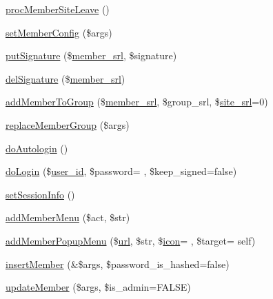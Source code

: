 \begin{DoxyCompactItemize}
\item 
\hyperlink{classmemberController_a46240bb8dbfcff52844ce8387076ca61}{proc\+Member\+Site\+Leave} ()
\item 
\hyperlink{classmemberController_a842fafd2abf22d779591486124003d92}{set\+Member\+Config} (\$args)
\item 
\hyperlink{classmemberController_a084c3af4daea1a860f95e06f2bc5fc28}{put\+Signature} (\$\hyperlink{ko_8install_8php_aa61f9e08f0fe505094d26f8143f30bbd}{member\+\_\+srl}, \$signature)
\item 
\hyperlink{classmemberController_a0fa2ec662eb7a40333ca2049a103385e}{del\+Signature} (\$\hyperlink{ko_8install_8php_aa61f9e08f0fe505094d26f8143f30bbd}{member\+\_\+srl})
\item 
\hyperlink{classmemberController_aca7533f0e95df7227073436c24827c7b}{add\+Member\+To\+Group} (\$\hyperlink{ko_8install_8php_aa61f9e08f0fe505094d26f8143f30bbd}{member\+\_\+srl}, \$group\+\_\+srl, \$\hyperlink{ko_8install_8php_a8b1406b4ad1048041558dce6bfe89004}{site\+\_\+srl}=0)
\item 
\hyperlink{classmemberController_acc92443cdd02e55cec12099722482737}{replace\+Member\+Group} (\$args)
\item 
\hyperlink{classmemberController_aeb2590d01346c9a25c2b22f99429f6a3}{do\+Autologin} ()
\item 
\hyperlink{classmemberController_a92930ff9a5763ef9d6d292c7154269e4}{do\+Login} (\$\hyperlink{ko_8install_8php_a74f1a394389d774e5b4cd5d1d15413f7}{user\+\_\+id}, \$password= \textquotesingle{}\textquotesingle{}, \$keep\+\_\+signed=false)
\item 
\hyperlink{classmemberController_ae4175b4a60e0b3000ed12e36508720ad}{set\+Session\+Info} ()
\item 
\hyperlink{classmemberController_aaa52725f8ba9ba16cfe4b350a51d7420}{add\+Member\+Menu} (\$act, \$str)
\item 
\hyperlink{classmemberController_a91303fbd27713d1990f88b8dd3c09b2b}{add\+Member\+Popup\+Menu} (\$\hyperlink{swfupload_8js_a440a52a9004fdab0700100a6ddb49f67}{url}, \$str, \$\hyperlink{config_8min_8js_a939508fb879a7e4dc00e07a67919400c}{icon}= \textquotesingle{}\textquotesingle{}, \$target= \textquotesingle{}self\textquotesingle{})
\item 
\hyperlink{classmemberController_ae588324b8e86b9259e40d104b4d2b42d}{insert\+Member} (\&\$args, \$password\+\_\+is\+\_\+hashed=false)
\item 
\hyperlink{classmemberController_ac1ad3397eda0a695046b023a14d25496}{update\+Member} (\$args, \$is\+\_\+admin=F\+A\+L\+SE)

\end{DoxyCompactItemize}
